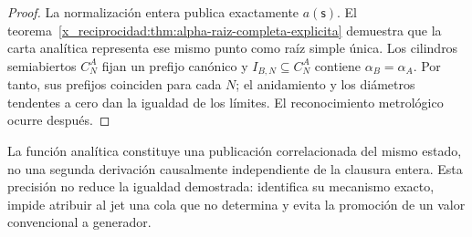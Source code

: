 \begin{proof}
La normalización entera publica exactamente \(a(\mathsf s)\). El
teorema~\ref{x_reciprocidad:thm:alpha-raiz-completa-explicita} demuestra que la carta
analítica representa ese mismo punto como raíz simple única. Los
cilindros semiabiertos \(C_N^A\) fijan un prefijo canónico y
\(I_{B,N}\subseteq C_N^A\) contiene \(\alpha_B=\alpha_A\). Por tanto, sus
prefijos coinciden para cada \(N\); el anidamiento y los diámetros tendentes a
cero dan la igualdad de los límites. El reconocimiento
metrológico ocurre después.
\end{proof}

La función analítica constituye una publicación correlacionada del mismo
estado, no una segunda derivación causalmente independiente de la clausura
entera. Esta precisión no reduce la igualdad demostrada: identifica su
mecanismo exacto, impide atribuir al jet una cola que no determina y evita la
promoción de un valor convencional a generador.




